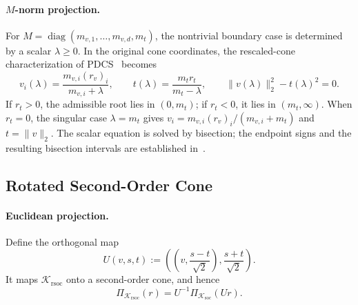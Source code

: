 \documentclass[letterpaper]{article} %
\theoremstyle{definition}
\theoremstyle{remark}
\begin{document}
\paragraph{\texorpdfstring{$M$}{M}-norm projection.}
For $M=\operatorname{diag}(m_{v,1},\ldots,m_{v,d},m_t)$, the nontrivial
boundary case is determined by a scalar $\lambda\ge0$. In the original cone
coordinates, the rescaled-cone characterization of PDCS~\cite{lin2025pdcs}
becomes
\begin{equation}
\label{eq:soc-metric-projection}
    v_i(\lambda)
    =\frac{m_{v,i}(r_v)_i}{m_{v,i}+\lambda},
    \qquad
    t(\lambda)=\frac{m_tr_t}{m_t-\lambda},
    \qquad
    \|v(\lambda)\|_2^2-t(\lambda)^2=0.
\end{equation}
If $r_t>0$, the admissible root lies in $(0,m_t)$; if $r_t<0$, it lies in
$(m_t,\infty)$.  When $r_t=0$, the singular case $\lambda=m_t$ gives
$v_i=m_{v,i}(r_v)_i/(m_{v,i}+m_t)$ and $t=\|v\|_2$.  The scalar equation is
solved by bisection; the endpoint signs and the resulting bisection intervals
are established in~\cite{lin2025pdcs}.

\subsection{Rotated Second-Order Cone}

\paragraph{Euclidean projection.}
Define the orthogonal map
\[
    U(v,s,t)
    :=
    \left(\left(v,\frac{s-t}{\sqrt2}\right),
          \frac{s+t}{\sqrt2}\right).
\]
It maps $\mathcal K_{\mathrm{rsoc}}$ onto a second-order cone, and hence
\begin{equation}
\label{eq:rsoc-via-soc}
    \Pi_{\mathcal K_{\mathrm{rsoc}}}(r)
    =U^{-1}\Pi_{\mathcal K_{\mathrm{soc}}}(Ur).
\end{equation}
\end{document}

